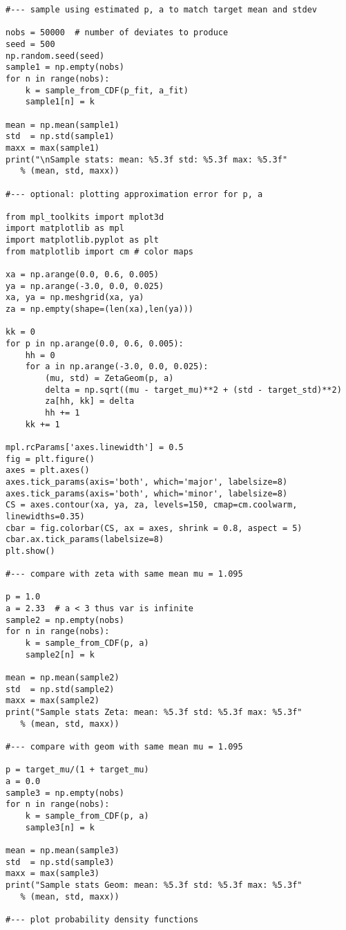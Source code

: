 \documentclass[oneside,10pt]{book}
\begin{document}
\begin{lstlisting}
#--- sample using estimated p, a to match target mean and stdev

nobs = 50000  # number of deviates to produce
seed = 500
np.random.seed(seed)
sample1 = np.empty(nobs)
for n in range(nobs):
    k = sample_from_CDF(p_fit, a_fit)
    sample1[n] = k

mean = np.mean(sample1)
std  = np.std(sample1)
maxx = max(sample1)
print("\nSample stats: mean: %5.3f std: %5.3f max: %5.3f" 
   % (mean, std, maxx))

#--- optional: plotting approximation error for p, a 

from mpl_toolkits import mplot3d
import matplotlib as mpl
import matplotlib.pyplot as plt
from matplotlib import cm # color maps

xa = np.arange(0.0, 0.6, 0.005)
ya = np.arange(-3.0, 0.0, 0.025)
xa, ya = np.meshgrid(xa, ya)
za = np.empty(shape=(len(xa),len(ya)))

kk = 0
for p in np.arange(0.0, 0.6, 0.005):
    hh = 0
    for a in np.arange(-3.0, 0.0, 0.025):
        (mu, std) = ZetaGeom(p, a)
        delta = np.sqrt((mu - target_mu)**2 + (std - target_std)**2)
        za[hh, kk] = delta
        hh += 1
    kk += 1

mpl.rcParams['axes.linewidth'] = 0.5
fig = plt.figure() 
axes = plt.axes()
axes.tick_params(axis='both', which='major', labelsize=8)
axes.tick_params(axis='both', which='minor', labelsize=8)
CS = axes.contour(xa, ya, za, levels=150, cmap=cm.coolwarm, linewidths=0.35)
cbar = fig.colorbar(CS, ax = axes, shrink = 0.8, aspect = 5)
cbar.ax.tick_params(labelsize=8)
plt.show()

#--- compare with zeta with same mean mu = 1.095

p = 1.0
a = 2.33  # a < 3 thus var is infinite
sample2 = np.empty(nobs)
for n in range(nobs):
    k = sample_from_CDF(p, a)
    sample2[n] = k

mean = np.mean(sample2)
std  = np.std(sample2)
maxx = max(sample2)
print("Sample stats Zeta: mean: %5.3f std: %5.3f max: %5.3f" 
   % (mean, std, maxx))

#--- compare with geom with same mean mu = 1.095

p = target_mu/(1 + target_mu)
a = 0.0
sample3 = np.empty(nobs)
for n in range(nobs):
    k = sample_from_CDF(p, a)
    sample3[n] = k

mean = np.mean(sample3)
std  = np.std(sample3)
maxx = max(sample3)
print("Sample stats Geom: mean: %5.3f std: %5.3f max: %5.3f" 
   % (mean, std, maxx))

#--- plot probability density functions


\end{lstlisting}
\end{document}
